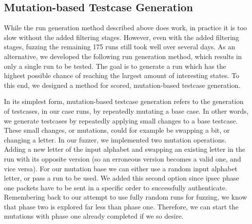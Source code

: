 
\subsection{Mutation-based Testcase Generation} \label{subsec:mutations}
While the run generation method described above does work, in practice it is too slow without the added filtering stages. However, even with the added filtering stages, fuzzing the remaining 175 runs still took well over several days. As an alternative, we developed the following run generation method, which results in only a single run to be tested. The goal is to generate a run which has the highest possible chance of reaching the largest amount of interesting states. To this end, we designed a method for scored, mutation-based testcase generation. 

In its simplest form, mutation-based testcase generation refers to the generation of testcases, in our case runs, by repeatedly mutating a base case. In other words, we generate testcases by repeatedly applying small changes to a base testcase. These small changes, or mutations, could for example be swapping a bit, or changing a letter. In our fuzzer, we implemented two mutation operations. Adding a new letter of the input alphabet and swapping an existing letter in the run with its opposite version (so an erroneous version becomes a valid one, and vice versa). For our mutation base we can either use a random input alphabet letter, or pass a run to be used. We added this second option since \ac{ipsec} phase one packets have to be sent in a specific order to successfully authenticate. Remembering back to our attempt to use fully random runs for fuzzing, we know that phase two is explored far less than phase one. Therefore, we can start the mutations with phase one already completed if we so desire. 

